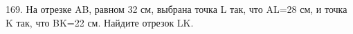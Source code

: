 169. На отрезке AB, равном 32 см, выбрана точка L так, что AL=28 см, и точка K так, что BK=22 см. Найдите отрезок LK.\\
